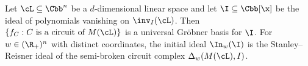 \begin{theo}\label{thm:main}
Let $\cL\subseteq \Cbb^n$ be a $d$-dimensional linear space and 
let $\I \subseteq \Cbb[\x]$ be the ideal of polynomials vanishing on $\inv_I(\cL)$. 
Then $\{f_C : C \text{ is a circuit of }M(\cL)\}$ is a universal Gr\"obner basis for $\I$. 
For $w\in (\R_+)^n$ with distinct coordinates, the initial ideal $\In_w(\I)$ is the Stanley--Reisner 
ideal of the semi-broken circuit complex $\Delta_w(M(\cL), I)$. 
\end{theo}
